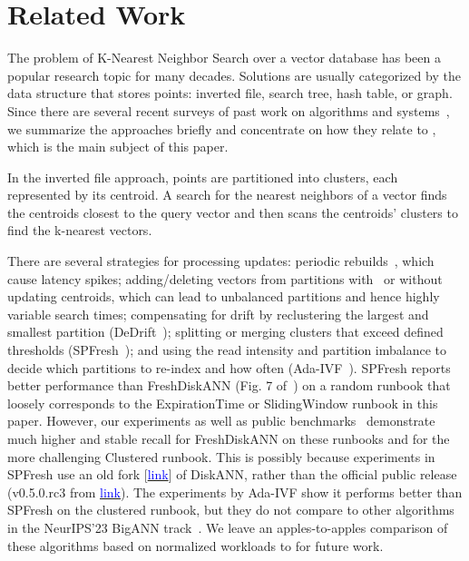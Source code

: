 

\section{Related Work}
\label{sec:related}
The problem of K-Nearest Neighbor Search over a vector database
has been a popular research topic for many decades. 
Solutions are usually categorized by the data structure that stores points:
inverted file, search tree, hash table, or graph.
Since there are several recent surveys of past work on algorithms
and systems~\cite{AumullerCeccarello23, GraphANNSSurvey21, PanWL24, TAIPALUS2024101216, TianYZ0Z023},
we summarize the approaches briefly and concentrate on how they relate to \name,
which is the main subject of this paper.

In the inverted file approach, points are partitioned into 
clusters, each represented by its centroid.
A search for the nearest neighbors of a vector finds the centroids closest to the query vector and then scans the centroids' clusters to find the k-nearest vectors.

There are several strategies for processing updates: 
periodic rebuilds~\cite{AnalyticDBV}, which cause latency spikes; 
adding/deleting vectors from partitions with~\cite{ArandjelovicZ13} or without~\cite{pgvector} updating centroids, which can lead to unbalanced partitions and hence highly variable search times; 
compensating for drift by reclustering the largest and smallest partition (DeDrift~\cite{BaranchukDUY23});
splitting or merging clusters that exceed defined thresholds (SPFresh~\cite{YumingXuEtAl23});
and using the read intensity and partition imbalance to decide which partitions
to re-index and how often (Ada-IVF~\cite{MahoneyEtAl24}).
SPFresh  reports better performance than FreshDiskANN (Fig. 7 of~\cite{YumingXuEtAl23})
on a random runbook
that loosely corresponds to the ExpirationTime or SlidingWindow runbook
in this paper.
However, our experiments as well as  public benchmarks~\cite{bigann23}
demonstrate much higher and stable recall for FreshDiskANN on these runbooks
and for the more challenging Clustered runbook. 
This is possibly because experiments in SPFresh use an old fork [\href{https://github.com/Yuming-Xu/DiskANN_Baseline/commits/main/}{\textcolor{blue}{link}}] of DiskANN, 
rather than the official public release (v0.5.0.rc3
from \href{https://github.com/microsoft/DiskANN/tags}{\textcolor{blue}{link}}).
The experiments by Ada-IVF show it performs better than SPFresh on the clustered runbook,
but they do not compare to other algorithms in the NeurIPS'23 BigANN track~\cite{simhadri2024resultsbigannneurips23}. 
We leave an apples-to-apples comparison of these algorithms
based on normalized workloads to \name for future work.



